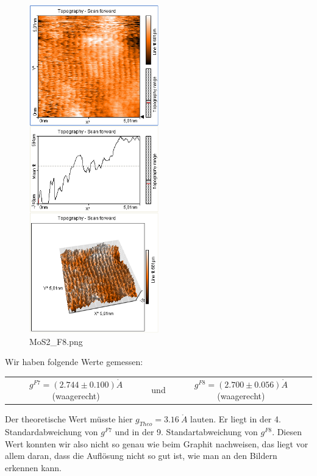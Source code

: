 \begin{figure}[H]
	\centering \includegraphics*[viewport= 5 528 322 825 , width = 0.5\textwidth]{messwerte/Freitag/MoS2_F8.png}
	\caption{MoS2\_F8.png}
	\end{figure}
	
Wir haben folgende Werte gemessen:

\begin{tabular}{c c c}
	$g^{F7} = (2.744 \pm 0.100) \mathring{A}$ (waagerecht) & und & $g^{F8} = (2.700 \pm 0.056) \mathring{A}$ (waagerecht)
\end{tabular}	
	
Der theoretische Wert müsste hier $g_{Theo} = 3.16\ \mathring A$ lauten. Er liegt in der 4. Standardabweichung von $g^{F7}$ und in der 9. Standartabweichung von $g^{F8}$. Diesen Wert konnten wir also nicht so genau wie beim Graphit nachweisen, das liegt vor allem daran, dass die Auflösung nicht so gut ist, wie man an den Bildern erkennen kann.
	
	
